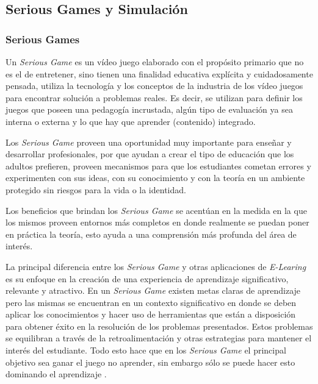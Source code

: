 
\subsection{Serious Games y Simulación}

\subsubsection{Serious Games}

Un \emph{Serious Game} es un vídeo juego elaborado con el propósito primario que
no es el de entretener\cite{sg:aoverview}, sino tienen una finalidad educativa
explícita y cuidadosamente pensada, utiliza la tecnología y los conceptos de la
industria de los vídeo juegos para encontrar solución a problemas reales. Es
decir, se utilizan para definir los juegos que poseen una pedagogía incrustada,
algún tipo de evaluación ya sea interna o externa y lo que hay que aprender
(contenido) integrado\cite{damien:sg}.

Los \emph{Serious Game} proveen una oportunidad muy importante para enseñar y
desarrollar profesionales, por que ayudan a crear el tipo de educación que los
adultos prefieren, proveen mecanismos para que los estudiantes cometan errores y
experimenten con sus ideas, con su conocimiento y con la teoría en un ambiente
protegido sin riesgos para la vida o la identidad. 

Los beneficios que brindan los \emph{Serious Game} se acentúan en la medida en
la que los mismos proveen entornos más completos en donde realmente se puedan
poner en práctica la teoría, esto ayuda a una comprensión más profunda del área
de interés.

La principal diferencia entre los \emph{Serious Game} y otras aplicaciones de
\emph{E-Learing} es su enfoque en la creación de una experiencia de aprendizaje
significativo, relevante y atractivo. En un \emph{Serious Game} existen metas
claras de aprendizaje pero las mismas se encuentran en un contexto significativo
en donde se deben aplicar los conocimientos y hacer uso de herramientas que
están a disposición para obtener éxito en la resolución de los problemas
presentados. Estos problemas se equilibran a través de la retroalimentación y
otras estrategias para mantener el interés del estudiante. Todo esto hace que en
los \emph{Serious Game} el principal objetivo sea ganar el juego no aprender,
sin embargo sólo se puede hacer esto dominando el aprendizaje
\cite{papertian:const}.

